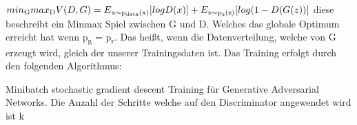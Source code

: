 \documentclass{llncs}
\begin{document}
\\\\
\begin{math}
min\textsubscript{G} max\textsubscript{D}V(D,G)=E\textsubscript{x$\sim$p\textsubscript{data}(x)}[logD(x)]  + E\textsubscript{z$\sim$p\textsubscript{z}(z)}[log(1-D(G(z))]
\\\\             
\end{math}
diese beschreibt ein Minmax Spiel zwischen G und D. Welches das globale Optimum erreicht hat wenn p\textsubscript{g} = p\textsubscript{r}. Das heißt, wenn die Datenverteilung, welche von G erzeugt wird, gleich der unserer Trainingsdaten ist\cite{goodfellow2014}. Das Training erfolgt durch den folgenden Algorithmus:
\\
\begin{algorithm}[H]
		\caption{Minibatch stochastic gradient descent Training für Generative Adversarial Networks. Die Anzahl der Schritte welche auf den Discriminator angewendet wird ist k }	
\end{algorithm}
\end{document}
